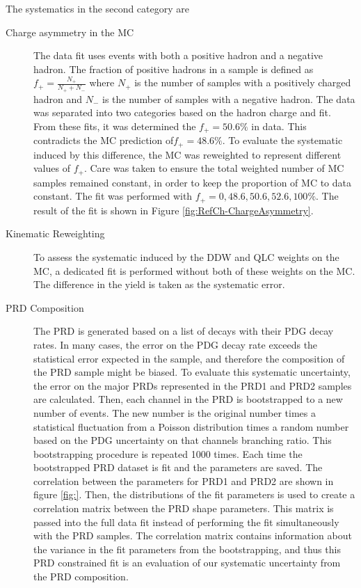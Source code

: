 The systematics in the second category are 
\begin{description}
    \item [Charge asymmetry in the MC] The data fit uses events with both a positive hadron and a negative hadron. The fraction of positive hadrons in a sample is defined as $f_+=\frac{N_+}{N_++N_-}$ where $N_+$ is the number of samples with a positively charged hadron and $N_-$ is the number of samples with a negative hadron. The data was separated into two categories based on the hadron charge and fit. From these fits, it was determined the $f_+=50.6\%$ in data. This contradicts the MC prediction of$f_+=48.6\%$. To evaluate the systematic induced by this difference, the MC was reweighted to represent different values of $f_+$. Care was taken to ensure the total weighted number of MC samples remained constant, in order to keep the proportion of MC to data constant. The fit was performed with  $f_+ = 0,48.6,50.6,52.6,100 \%$. The result of the fit is shown in Figure \ref{fig:RefCh-ChargeAsymmetry}.

    \item[Kinematic Reweighting] To assess the systematic induced by the DDW and QLC weights on the MC, a dedicated fit is performed without both of these weights on the MC. The difference in the yield is taken as the systematic error.
    
    \item[PRD Composition] The PRD is generated based on a list of decays with their PDG decay rates. In many cases, the error on the PDG decay rate exceeds the statistical error expected in the sample, and therefore the composition of the PRD sample might be biased. To evaluate this systematic uncertainty, the error on the major PRDs represented in the PRD1 and PRD2 samples are calculated. Then, each channel in the PRD is bootstrapped to a new number of events. The new number is the original number times a statistical fluctuation from a Poisson distribution times a random number based on the PDG uncertainty on that channels branching ratio. This bootstrapping procedure is repeated 1000 times. Each time the bootstrapped PRD dataset is fit and the parameters are saved. The correlation between the parameters for PRD1 and PRD2 are shown in figure \ref{fig:}. Then, the distributions of the fit parameters is used to create a correlation matrix between the PRD shape parameters. This matrix is passed into the full data fit instead of performing the fit simultaneously with the PRD samples. The correlation matrix contains information about the variance in the fit parameters from the bootstrapping, and thus this PRD constrained fit is an evaluation of our systematic uncertainty from the PRD composition. 

\end{description}

